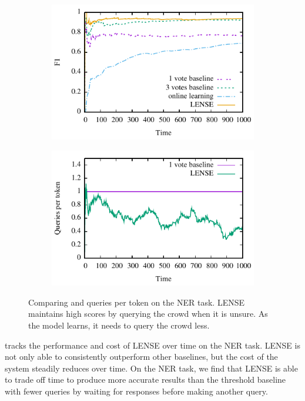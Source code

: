 \begin{figure}[t]
  \centering
  \begin{subfigure}[b]{0.49\textwidth}
  \includegraphics[width=\textwidth]{figures/ner_2_class/f1_plot/f1_vs_time.pdf}
\end{subfigure}
  \begin{subfigure}[b]{0.49\textwidth}
  \includegraphics[width=\textwidth]{figures/ner_2_class/cost_plot/cost_vs_time.pdf}
  \end{subfigure}
  \caption{Comparing \fone{} and queries per token on the NER task. LENSE maintains high \fone{} scores by querying the crowd when it is unsure. As the model learns, it needs to query the crowd less.}
\label{fig:ner-f1}
\end{figure}

 tracks the performance and cost of LENSE over time on the NER task.
LENSE is not only able  to consistently outperform other baselines, but the cost of the system steadily reduces over time.
On the NER task, we find that LENSE is able to trade off time to produce more accurate results than the threshold baseline with fewer queries by waiting for responses before making another query.

